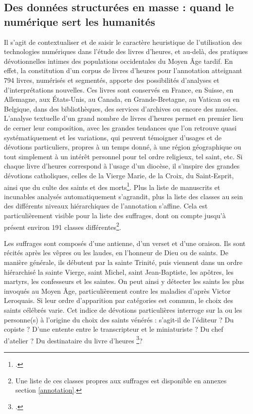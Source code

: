 \documentclass[a4paper,12pt,twoside]{book}
\begin{document}
	
	\subsection{Des données structurées en masse : quand le numérique sert les humanités}
	
	Il s'agit de contextualiser et de saisir le caractère heuristique de l'utilisation des technologies numériques dans l'étude des livres d'heures, et au-delà, des pratiques dévotionnelles intimes des populations occidentales du Moyen Âge tardif. En effet, la constitution d'un corpus de livres d'heures pour l'annotation atteignant 794 livres, numérisés et segmentés, apporte des possibilités d'analyses et d'interprétations nouvelles. Ces livres sont conservés en France, en Suisse, en Allemagne, aux États-Unis, au Canada, en Grande-Bretagne, au Vatican ou en Belgique, dans des bibliothèques, des services d’archives ou encore des musées.\\
	
	L'analyse textuelle d'un grand nombre de livres d'heures permet en premier lieu de cerner leur composition, avec les grandes tendances que l'on retrouve quasi systématiquement et les variations, qui peuvent témoigner d'usages et de dévotions particuliers, propres à un temps donné, à une région géographique ou tout simplement à un intérêt personnel pour tel ordre religieux, tel saint, etc. Si chaque livre d'heures correspond à l'usage d'un diocèse, il s'inspire des grandes dévotions catholiques, celles de la Vierge Marie, de la Croix, du Saint-Esprit, ainsi que du culte des saints et des morts\footcite[p. VII-IX]{Leroquais_notices}. Plus la liste de manuscrits et incunables analysés automatiquement s'agrandit, plus la liste des classes au sein des différents niveaux hiérarchiques de l'annotation s'affine. Cela est particulièrement visible pour la liste des suffrages, dont on compte jusqu'à présent environ 191 classes différentes\footnote{Une liste de ces classes propres aux suffrages est disponible en annexes section \ref{annotation}.}. 
	
	Les suffrages sont composés d'une antienne, d'un verset et d'une oraison. Ils sont récités après les vêpres ou les laudes, en l'honneur de Dieu ou de saints. De manière générale, ils débutent par la sainte Trinité, puis viennent dans un ordre hiérarchisé la sainte Vierge, saint Michel, saint Jean-Baptiste, les apôtres, les martyrs, les confesseurs et les saintes. On peut ainsi y détecter les saints les plus invoqués au Moyen Âge, particulièrement contre les maladies d'après Victor Leroquais. Si leur ordre d'apparition par catégories est commun, le choix des saints célébrés varie. Cet indice de dévotions particulières interroge sur la ou les personne(s) à l'origine du choix des saints vénérés : s'agit-il de l'éditeur ? Du copiste ? D'une entente entre le transcripteur et le miniaturiste ? Du chef d'atelier ? Du destinataire du livre d'heures \footcite[p. XXI-XXII]{Leroquais_notices}? 
	
\end{document}
